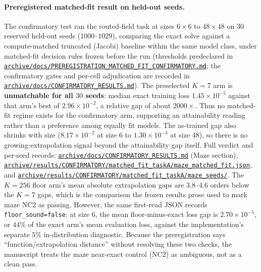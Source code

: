 \paragraph{Preregistered matched-fit result on held-out seeds.}
The confirmatory test ran the routed-field task at sizes $6\times6$ to
$48\times48$ on $30$ reserved held-out seeds ($1000$--$1029$), comparing the
exact solve against a compute-matched truncated (Jacobi) baseline within the
same model class, under matched-fit decision rules frozen before the run
(thresholds predeclared in
\href{https://github.com/vanshsehrawat14/gabp-sparse-inv/blob/main/archive/docs/PREREGISTRATION_MATCHED_FIT_CONFIRMATORY.md}
{\nolinkurl{archive/docs/PREREGISTRATION_MATCHED_FIT_CONFIRMATORY.md}}; the
confirmatory gates and per-cell adjudication are recorded in
\href{https://github.com/vanshsehrawat14/gabp-sparse-inv/blob/main/archive/docs/CONFIRMATORY_RESULTS.md}
{\nolinkurl{archive/docs/CONFIRMATORY_RESULTS.md}}). The preselected $K=7$ arm is
\textbf{unmatchable for all $30$ seeds}: median exact training loss
$1.45\times10^{-5}$ against that arm's best of $2.96\times10^{-2}$,
a relative gap of about $2000\times$. Thus no matched-fit regime exists for
the confirmatory arm, supporting an attainability reading rather than a
preference among equally fit models. The
as-trained gap also shrinks with size ($8.17\times10^{-2}$ at size $6$ to
$1.30\times10^{-3}$ at size $48$), so there is no growing-extrapolation
signal beyond the attainability gap itself.
Full verdict and per-seed records:
\href{https://github.com/vanshsehrawat14/gabp-sparse-inv/blob/main/archive/docs/CONFIRMATORY_RESULTS.md}
{\nolinkurl{archive/docs/CONFIRMATORY_RESULTS.md}} (Maze section),
\href{https://github.com/vanshsehrawat14/gabp-sparse-inv/blob/main/archive/results/CONFIRMATORY/matched_fit_taskA/maze_matched_fit.json}
{\nolinkurl{archive/results/CONFIRMATORY/matched_fit_taskA/maze_matched_fit.json}},
and \href{https://github.com/vanshsehrawat14/gabp-sparse-inv/tree/main/archive/results/CONFIRMATORY/matched_fit_taskA/maze_seeds/}
{\nolinkurl{archive/results/CONFIRMATORY/matched_fit_taskA/maze_seeds/}}.
The $K=256$ floor arm's mean absolute extrapolation gaps are 3.8--4.6 orders
below the $K=7$ gaps, which is the comparison the frozen results prose used to mark
maze NC2 as passing. However, the same first-read JSON records
\texttt{floor\_sound=false}: at size 6, the mean floor-minus-exact loss gap is
$2.70\times10^{-5}$, or $44\%$ of the exact arm's mean evaluation loss,
against the implementation's separate $5\%$ in-distribution diagnostic.
Because the preregistration says ``function/extrapolation distance'' without
resolving these two checks, the manuscript treats the maze near-exact control
(NC2) as ambiguous, not as a clean pass.

